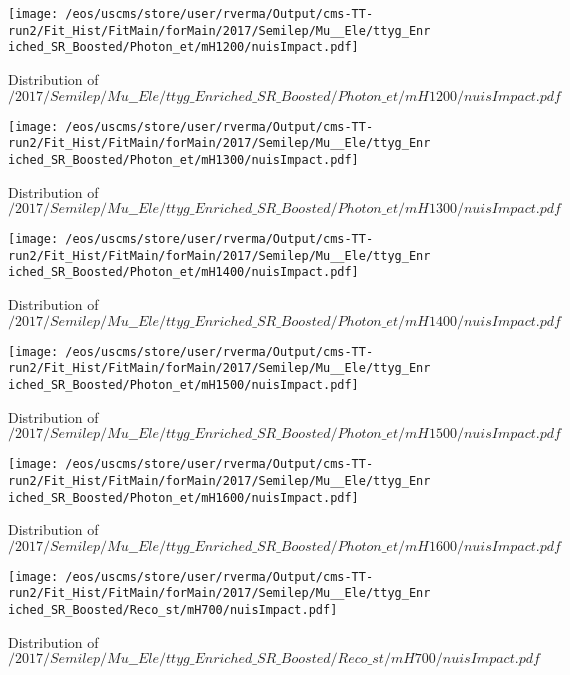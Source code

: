 \begin{figure}
\centering
\texttt{[image: /eos/uscms/store/user/rverma/Output/cms-TT-run2/Fit\_Hist/FitMain/forMain/2017/Semilep/Mu\_\_Ele/ttyg\_Enriched\_SR\_Boosted/Photon\_et/mH1200/nuisImpact.pdf]}
\caption{Distribution of $/2017/Semilep/Mu\_\_Ele/ttyg\_Enriched\_SR\_Boosted/Photon\_et/mH1200/nuisImpact.pdf$}
\end{figure}

\begin{figure}
\centering
\texttt{[image: /eos/uscms/store/user/rverma/Output/cms-TT-run2/Fit\_Hist/FitMain/forMain/2017/Semilep/Mu\_\_Ele/ttyg\_Enriched\_SR\_Boosted/Photon\_et/mH1300/nuisImpact.pdf]}
\caption{Distribution of $/2017/Semilep/Mu\_\_Ele/ttyg\_Enriched\_SR\_Boosted/Photon\_et/mH1300/nuisImpact.pdf$}
\end{figure}

\begin{figure}
\centering
\texttt{[image: /eos/uscms/store/user/rverma/Output/cms-TT-run2/Fit\_Hist/FitMain/forMain/2017/Semilep/Mu\_\_Ele/ttyg\_Enriched\_SR\_Boosted/Photon\_et/mH1400/nuisImpact.pdf]}
\caption{Distribution of $/2017/Semilep/Mu\_\_Ele/ttyg\_Enriched\_SR\_Boosted/Photon\_et/mH1400/nuisImpact.pdf$}
\end{figure}

\begin{figure}
\centering
\texttt{[image: /eos/uscms/store/user/rverma/Output/cms-TT-run2/Fit\_Hist/FitMain/forMain/2017/Semilep/Mu\_\_Ele/ttyg\_Enriched\_SR\_Boosted/Photon\_et/mH1500/nuisImpact.pdf]}
\caption{Distribution of $/2017/Semilep/Mu\_\_Ele/ttyg\_Enriched\_SR\_Boosted/Photon\_et/mH1500/nuisImpact.pdf$}
\end{figure}

\begin{figure}
\centering
\texttt{[image: /eos/uscms/store/user/rverma/Output/cms-TT-run2/Fit\_Hist/FitMain/forMain/2017/Semilep/Mu\_\_Ele/ttyg\_Enriched\_SR\_Boosted/Photon\_et/mH1600/nuisImpact.pdf]}
\caption{Distribution of $/2017/Semilep/Mu\_\_Ele/ttyg\_Enriched\_SR\_Boosted/Photon\_et/mH1600/nuisImpact.pdf$}
\end{figure}

\begin{figure}
\centering
\texttt{[image: /eos/uscms/store/user/rverma/Output/cms-TT-run2/Fit\_Hist/FitMain/forMain/2017/Semilep/Mu\_\_Ele/ttyg\_Enriched\_SR\_Boosted/Reco\_st/mH700/nuisImpact.pdf]}
\caption{Distribution of $/2017/Semilep/Mu\_\_Ele/ttyg\_Enriched\_SR\_Boosted/Reco\_st/mH700/nuisImpact.pdf$}
\end{figure}

